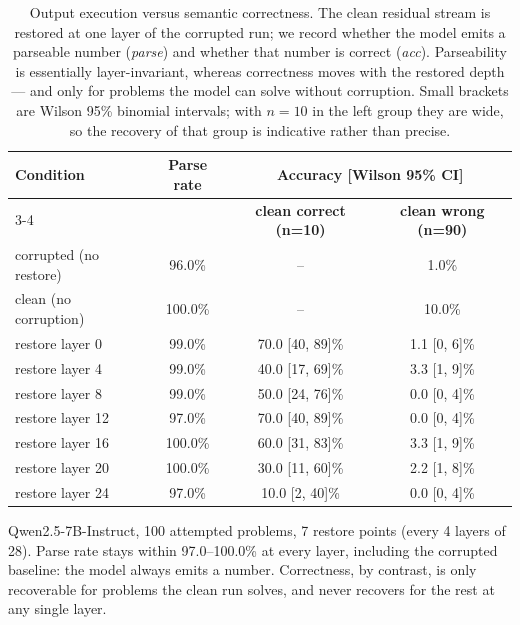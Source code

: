 \begin{table}[t]
  \centering
  \caption{Output execution versus semantic correctness. The clean residual stream is
           restored at one layer of the corrupted run; we record whether the model emits a
           parseable number (\emph{parse}) and whether that number is correct (\emph{acc}).
           Parseability is essentially layer-invariant, whereas correctness moves with the
           restored depth --- and only for problems the model can solve without corruption.
           Small brackets are Wilson 95\% binomial intervals; with
           $n=10$ in the left group they are wide, so the recovery of that
           group is indicative rather than precise.}
  \label{tab:layer-parse-acc}
  \small
  \begin{tabular}{@{}l c c c@{}}
    \toprule
    \multirow{2}{*}{\textbf{Condition}} & \multirow{2}{*}{\textbf{Parse rate}} &
      \multicolumn{2}{c}{\textbf{Accuracy [Wilson 95\% CI]}} \\
    \cmidrule(lr){3-4}
    & & \textbf{clean correct (n=10)} & \textbf{clean wrong (n=90)} \\
    \midrule
    corrupted (no restore) & 96.0\% & -- & 1.0\% \\
    clean (no corruption)  & 100.0\% & -- & 10.0\% \\
    \midrule
    restore layer 0 & 99.0\% & 70.0 \scriptsize[40, 89]\% & 1.1 \scriptsize[0, 6]\% \\
    restore layer 4 & 99.0\% & 40.0 \scriptsize[17, 69]\% & 3.3 \scriptsize[1, 9]\% \\
    restore layer 8 & 99.0\% & 50.0 \scriptsize[24, 76]\% & 0.0 \scriptsize[0, 4]\% \\
    restore layer 12 & 97.0\% & 70.0 \scriptsize[40, 89]\% & 0.0 \scriptsize[0, 4]\% \\
    restore layer 16 & 100.0\% & 60.0 \scriptsize[31, 83]\% & 3.3 \scriptsize[1, 9]\% \\
    restore layer 20 & 100.0\% & 30.0 \scriptsize[11, 60]\% & 2.2 \scriptsize[1, 8]\% \\
    restore layer 24 & 97.0\% & 10.0 \scriptsize[2, 40]\% & 0.0 \scriptsize[0, 4]\% \\
    \bottomrule
  \end{tabular}
  \vspace{2pt}
  \parbox{\linewidth}{\footnotesize
  Qwen2.5-7B-Instruct, 100 attempted problems, 7 restore points
  (every 4 layers of 28). Parse rate stays within
  97.0--100.0\% at every layer, including the corrupted baseline:
  the model always emits a number. Correctness, by contrast, is only recoverable for
  problems the clean run solves, and never recovers for the rest at any single layer.}
\end{table}
